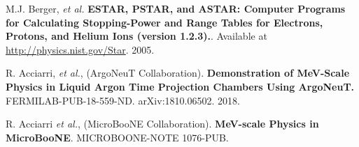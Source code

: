   M.J. Berger, \textit{et al.} \textbf{ESTAR, PSTAR, and ASTAR: Computer Programs for Calculating Stopping-Power and Range Tables for Electrons, Protons, and Helium Ions (version 1.2.3).}. Available at \href{http://physics.nist.gov/Star}{http://physics.nist.gov/Star}. 2005.

 R. Acciarri, \textit{et al.}, (ArgoNeuT Collaboration). \textbf{Demonstration of MeV-Scale Physics in
Liquid Argon Time Projection Chambers Using ArgoNeuT.} FERMILAB-PUB-18-559-ND. arXiv:1810.06502. 2018.

 R. Acciarri \textit{et al.}, (MicroBooNE Collaboration). \textbf{MeV-scale Physics in MicroBooNE}. MICROBOONE-NOTE 1076-PUB. 
